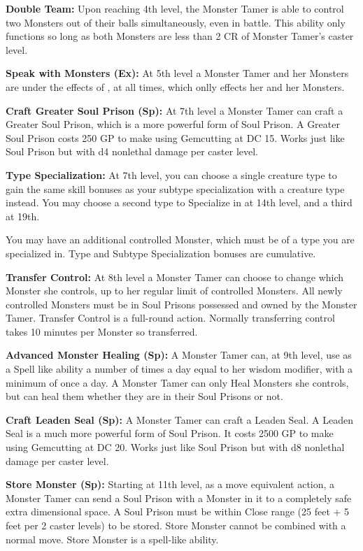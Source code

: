 \textbf{Double Team:} Upon reaching 4th level, the Monster Tamer is able to control two Monsters out of their balls simultaneously, even in battle. This ability only functions so long as both Monsters are less than 2 CR of  Monster Tamer's caster level.

\textbf{Speak with Monsters (Ex):} At 5th level a Monster Tamer and her Monsters are under the effects of , at all times, which onlly effects her and her Monsters.

\textbf{Craft Greater Soul Prison (Sp):} At 7th level a Monster Tamer can craft a Greater Soul Prison, which is a more powerful form of Soul Prison. A Greater Soul Prison costs 250 GP to make using  Gemcutting at DC 15. Works just like Soul Prison but with d4 nonlethal damage per caster level.

\textbf{Type Specialization:} At 7th level, you can choose a single creature type to gain the same skill bonuses as your subtype specialization
with a creature type instead. You may choose a second type to Specialize in at 14th level, and a third at 19th.

You may have an additional controlled Monster, which must be of a type you are specialized in. Type and Subtype Specialization bonuses are cumulative.

\textbf{Transfer Control:} At 8th level a Monster Tamer can choose to change which Monster she controls, up to her regular limit of controlled Monsters. All newly controlled Monsters must be in Soul Prisons possessed and owned by the Monster Tamer. Transfer Control is a full-round action. Normally transferring control takes 10 minutes per Monster so transferred.

\textbf{Advanced Monster Healing (Sp):} A Monster Tamer can, at 9th level, use  as a Spell like ability a number of times a day equal to her wisdom modifier, with a minimum of once a day. A Monster Tamer can only Heal Monsters she controls, but can heal them whether they are in their Soul Prisons or not.

\textbf{Craft Leaden Seal (Sp):} A Monster Tamer can craft a Leaden Seal. A Leaden Seal is a much more powerful form of Soul Prison. It costs 2500 GP to make using  Gemcutting at DC 20. Works just like Soul Prison but with d8 nonlethal damage per caster level.

\textbf{Store Monster (Sp):} Starting at 11th level, as a move equivalent action, a Monster Tamer can send a Soul Prison with a Monster in it to a completely safe extra dimensional space. A Soul Prison must be within Close range (25 feet + 5 feet per 2 caster levels) to be stored. Store Monster cannot be combined with a normal move. Store Monster is a spell-like ability.


